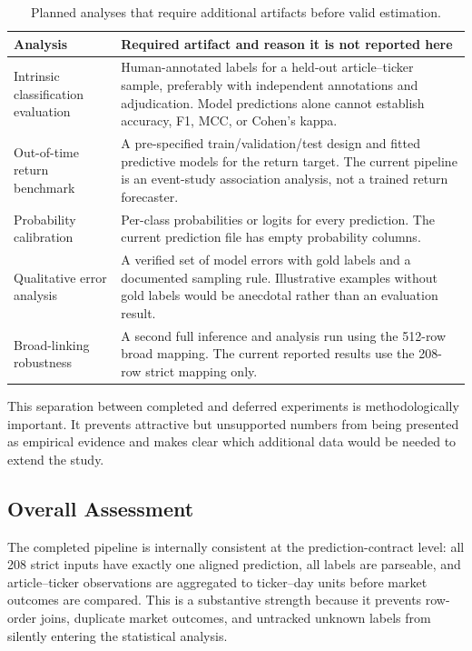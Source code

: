 \begin{table}[htbp]
\centering
\caption{Planned analyses that require additional artifacts before valid estimation.}
\label{tab:deferred-experiments}
\begin{tabular}{p{}p{}}
\toprule
\textbf{Analysis} & \textbf{Required artifact and reason it is not reported here} \\
\midrule
Intrinsic classification evaluation & Human-annotated labels for a held-out article--ticker sample, preferably with independent annotations and adjudication. Model predictions alone cannot establish accuracy, F1, MCC, or Cohen's kappa. \\
Out-of-time return benchmark & A pre-specified train/validation/test design and fitted predictive models for the return target. The current pipeline is an event-study association analysis, not a trained return forecaster. \\
Probability calibration & Per-class probabilities or logits for every prediction. The current prediction file has empty probability columns. \\
Qualitative error analysis & A verified set of model errors with gold labels and a documented sampling rule. Illustrative examples without gold labels would be anecdotal rather than an evaluation result. \\
Broad-linking robustness & A second full inference and analysis run using the 512-row broad mapping. The current reported results use the 208-row strict mapping only. \\
\bottomrule
\end{tabular}
\end{table}

This separation between completed and deferred experiments is methodologically important. It prevents attractive but unsupported numbers from being presented as empirical evidence and makes clear which additional data would be needed to extend the study.

\subsection{Overall Assessment}
\label{subsec:overall-assessment}

The completed pipeline is internally consistent at the prediction-contract level: all 208 strict inputs have exactly one aligned prediction, all labels are parseable, and article--ticker observations are aggregated to ticker--day units before market outcomes are compared. This is a substantive strength because it prevents row-order joins, duplicate market outcomes, and untracked unknown labels from silently entering the statistical analysis.

